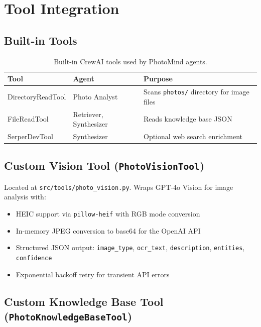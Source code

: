 \documentclass[11pt,letterpaper]{article}
\begin{document}
\section{Tool Integration}
\label{sec:tools}

\subsection{Built-in Tools}

\begin{table}[H]
\centering
\small
\begin{tabularx}{\textwidth}{llX}
\toprule
\textbf{Tool} & \textbf{Agent} & \textbf{Purpose} \\
\midrule
DirectoryReadTool & Photo Analyst & Scans \texttt{photos/} directory for image files \\
FileReadTool & Retriever, Synthesizer & Reads knowledge base JSON \\
SerperDevTool & Synthesizer & Optional web search enrichment \\
\bottomrule
\end{tabularx}
\caption{Built-in CrewAI tools used by PhotoMind agents.}
\label{tab:builtin-tools}
\end{table}

\subsection{Custom Vision Tool (\texttt{PhotoVisionTool})}

Located at \texttt{src/tools/photo\_vision.py}. Wraps GPT-4o Vision for image analysis with:
\begin{itemize}[nosep]
  \item HEIC support via \texttt{pillow-heif} with RGB mode conversion
  \item In-memory JPEG conversion to base64 for the OpenAI API
  \item Structured JSON output: \texttt{image\_type}, \texttt{ocr\_text}, \texttt{description}, \texttt{entities}, \texttt{confidence}
  \item Exponential backoff retry for transient API errors
\end{itemize}

\subsection{Custom Knowledge Base Tool (\texttt{PhotoKnowledgeBaseTool})}
\end{document}
